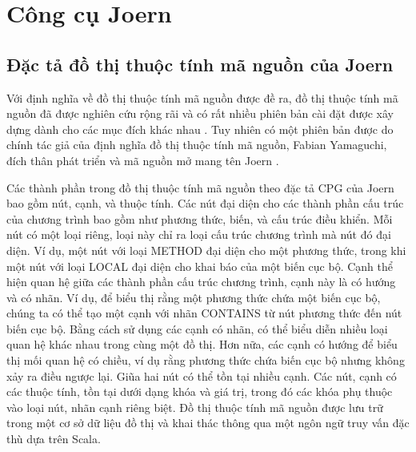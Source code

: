 \section{Công cụ Joern}

\subsection{Đặc tả đồ thị thuộc tính mã nguồn của Joern}


Với định nghĩa về đồ thị thuộc tính mã nguồn được đề ra, đồ thị thuộc tính mã nguồn đã được nghiên cứu rộng rãi và có rất nhiều phiên bản cài đặt được xây dựng dành cho các mục đích khác nhau \cite{ xiaomeng2018cpgva, kuchler2022representing, weiss2022language, keirsgieter2020graft}. Tuy nhiên có một phiên bản được do chính tác giả của định nghĩa đồ thị thuộc tính mã nguồn, Fabian Yamaguchi, đích thân phát triển và mã nguồn mở mang tên Joern \cite{joernJoernHunteraposs}.

Các thành phần trong đồ thị thuộc tính mã nguồn theo đặc tả CPG của Joern bao gồm nút, cạnh, và thuộc tính. Các nút đại diện cho các thành phần cấu trúc của chương trình bao gồm như phương thức, biến, và cấu trúc điều khiển. Mỗi nút có một loại riêng, loại này chỉ ra loại cấu trúc chương trình mà nút đó đại diện. Ví dụ, một nút với loại METHOD đại diện cho một phương thức, trong khi một nút với loại LOCAL đại diện cho khai báo của một biến cục bộ. Cạnh thể hiện quan hệ giữa các thành phần cấu trúc chương trình, cạnh này là có hướng và có nhãn. Ví dụ, để biểu thị rằng một phương thức chứa một biến cục bộ, chúng ta có thể tạo một cạnh với nhãn CONTAINS từ nút phương thức đến nút biến cục bộ. Bằng cách sử dụng các cạnh có nhãn, có thể biểu diễn nhiều loại quan hệ khác nhau trong cùng một đồ thị. Hơn nữa, các cạnh có hướng để biểu thị mối quan hệ có chiều, ví dụ rằng phương thức chứa biến cục bộ nhưng không xảy ra điều ngược lại. Giũa hai nút có thể tồn tại nhiều cạnh. Các nút, cạnh có các thuộc tính, tồn tại dưới dạng khóa và giá trị, trong đó các khóa phụ thuộc vào loại nút, nhãn cạnh riêng biệt. Đồ thị thuộc tính mã nguồn được lưu trữ trong một cơ sở dữ liệu đồ thị và khai thác thông qua một ngôn ngữ truy vấn đặc thù dựa trên Scala.


